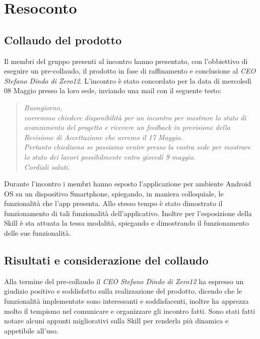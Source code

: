 \clearpage
\section{Resoconto}
	\subsection{Collaudo del prodotto}
	\label{sec:collaudo}
	Il membri del gruppo presenti al incontro hanno presentato, con l'obbiettivo di eseguire un pre-collaudo, il prodotto in fase di raffinamento e conclusione al \emph{CEO Stefano Dindo di Zero12}. L'incontro è stato concordato per la data di mercoledì 08 Maggio presso la loro sede, inviando una mail con il seguente testo:
	\begin{quote}
		\emph{Buongiorno,\\[0.25cm]vorremmo chiedere disponibilità per un incontro per mostrare lo stato di avanzamento del progetto e ricevere un feedback in previsione della Revisione di Accettazione che avremo il 17 Maggio.\\Pertanto chiediamo se possiamo venire presso la vostra sede per mostrare lo stato dei lavori possibilmente entro giovedì 9 maggio.\\Cordiali saluti.
		}
	\end{quote}
	Durante l'incontro i membri hanno esposto l'applicazione per ambiente Android OS  su un dispositivo Smartphone, spiegando, in maniera colloquiale, le funzionalità che l'app presenta. Allo stesso tempo è stato dimostrato il funzionamento di tali funzionalità dell'applicativo. Inoltre per l'esposizione della Skill è sta attuata la tessa modalità,  spiegando e dimostrando il funzionamento delle sue funzionalità.
	\subsection{Risultati e considerazione del collaudo}
	\label{sec:feedback}
	Alla termine del pre-collaudo il \emph{CEO Stefano Dindo di Zero12} ha espresso un giudizio positivo e soddisfatto sulla realizzazione del prodotto, dicendo che le funzionalità implementate sono interessanti e soddisfacenti, inoltre ha apprezza molto il tempismo nel comunicare e organizzare gli incontro fatti. Sono stati fatti notare alcuni appunti migliorativi sulla Skill per renderla più dinamica e appetibile all'uso.